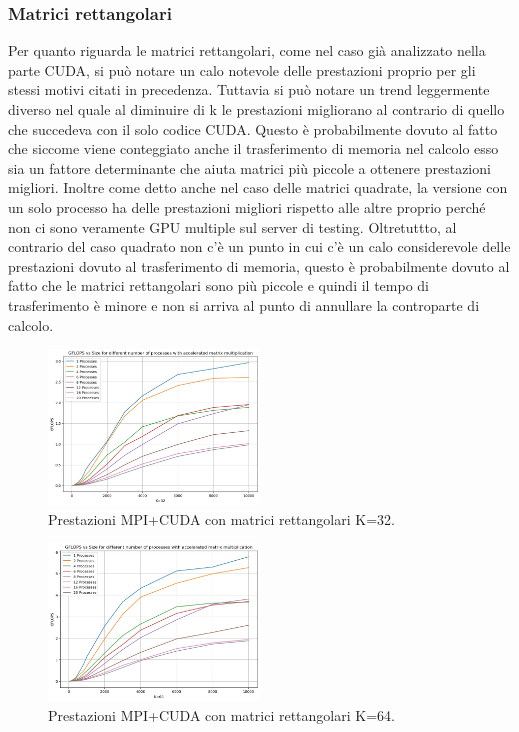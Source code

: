 \documentclass[conference]{IEEEtran}
\begin{document}
\subsubsection{Matrici rettangolari}
Per quanto riguarda le matrici rettangolari, come nel caso già analizzato nella parte CUDA, si può notare un calo notevole delle prestazioni proprio per gli stessi motivi citati in precedenza. Tuttavia si può notare un trend leggermente diverso nel quale al diminuire di k le prestazioni migliorano al contrario di quello che succedeva con il solo codice CUDA. Questo è probabilmente dovuto al fatto che siccome viene conteggiato anche il trasferimento di memoria nel calcolo esso sia un fattore determinante che aiuta matrici più piccole a ottenere prestazioni migliori.
Inoltre come detto anche nel caso delle matrici quadrate, la versione con un solo processo ha delle prestazioni migliori rispetto alle altre proprio perché non ci sono veramente GPU multiple sul server di testing. Oltretuttto, al contrario del caso quadrato non c'è un punto in cui c'è un calo considerevole delle prestazioni dovuto al trasferimento di memoria, questo è probabilmente dovuto al fatto che le matrici rettangolari sono più piccole e quindi il tempo di trasferimento è minore e non si arriva al punto di annullare la controparte di calcolo.
\begin{figure}[H]
    \centering
    \includegraphics[width=0.5\textwidth]{resources/mpi_cuda_32.jpg}
    \caption{Prestazioni MPI+CUDA con matrici rettangolari K=32.}
    \label{fig:mpi_cuda_32}
\end{figure}
\begin{figure}[H]
    \centering
    \includegraphics[width=0.5\textwidth]{resources/mpi_cuda_64.jpg}
    \caption{Prestazioni MPI+CUDA con matrici rettangolari K=64.}
    \label{fig:mpi_cuda_64}
\end{figure}
\end{document}
